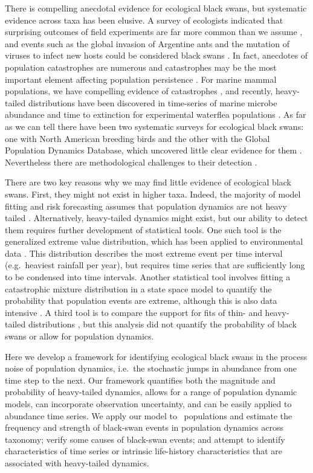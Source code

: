 There is compelling anecdotal evidence for ecological black swans, but systematic evidence across taxa has been elusive. A survey of ecologists indicated that surprising outcomes of field experiments are far more common than we assume \citep{doak2008}, and events such as the global invasion of  Argentine ants and the mutation of viruses to infect new hosts could be considered black swans \citep{nunez2012}. In fact, anecdotes of population catastrophes are numerous and catastrophes may be the most important element affecting population persistence \citep{mangel1994}. For marine mammal populations, we have compelling evidence of catastrophes \citep{gerber2001, ward2007}, and recently, heavy-tailed distributions have been discovered in time-series of marine microbe abundance \citep{segura2013} and time to extinction for experimental waterflea populations \citep{drake2014}. As far as we can tell there have been two systematic surveys for ecological black swans: one with North American breeding birds and the other with the Global Population Dynamics Database, which uncovered little clear evidence for them \citep{keitt1998,allen2001,halley2002}. Nevertheless there are methodological challenges to their detection \citep{allen2001,ward2007}.

There are two key reasons why we may find little evidence of ecological black swans. First, they might not exist in higher taxa. Indeed, the majority of model fitting and risk forecasting assumes that population dynamics are not heavy tailed \citep[e.g.][]{brook2006a,dennis2006,knape2012}. Alternatively, heavy-tailed dynamics might exist, but our ability to detect them requires further development of statistical tools. One such tool is the generalized extreme value distribution, which has been applied to environmental data \citep[e.g.][]{katz2005}. This distribution describes the most extreme event per time interval (e.g.~heaviest rainfall per year), but requires time series that are sufficiently long to be condensed into time intervals. Another statistical tool involves fitting a catastrophic mixture distribution in a state space model to quantify the probability that population events are extreme, although this is also data intensive \citep{ward2007}. A third tool is to compare the support for fits of thin- and heavy-tailed distributions \citep{halley2002}, but this analysis did not quantify the probability of black swans or allow for population dynamics.

Here we develop a framework for identifying ecological black swans in the process noise of population dynamics, i.e.\ the stochastic jumps in abundance from one time step to the next. Our framework quantifies both the magnitude and probability of heavy-tailed dynamics, allows for a range of population dynamic models, can incorporate observation uncertainty, and can be easily applied to abundance time series. We apply our model to \NPops\ populations and estimate the frequency and strength of black-swan events in population dynamics across taxonomy; verify some causes of black-swan events; and attempt to identify characteristics of time series or intrinsic life-history characteristics that are associated with heavy-tailed dynamics.

